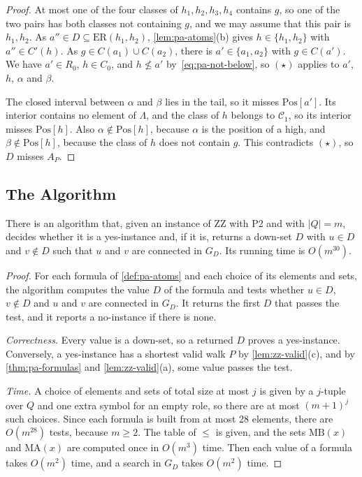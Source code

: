 \documentclass[pdflatex,sn-mathphys-num]{sn-jnl}%
\theoremstyle{thmstyleone}%
\theoremstyle{thmstyletwo}%
\theoremstyle{thmstylethree}%
\newcommand{\MB}{\mathrm{MB}}%
\newcommand{\MA}{\mathrm{MA}}%
\newcommand{\Pos}{\mathrm{Pos}}%
\newcommand{\ER}{\mathrm{ER}}%
\begin{document}
\begin{proof}
At most one of the four classes of $h_1, h_2, h_3, h_4$ contains $g$, so one of the two pairs has both classes not containing $g$, and we may assume that this pair is $h_1, h_2$.
As $a'' \in D \subseteq \ER(h_1, h_2)$, \cref{lem:pa-atoms}(b) gives $h \in \{h_1, h_2\}$ with $a'' \in C'(h)$.
As $g \in C(a_1) \cup C(a_2)$, there is $a' \in \{a_1, a_2\}$ with $g \in C(a')$.
We have $a' \in R_0$, $h \in C_0$, and $h \not\leq a'$ by~\eqref{eq:pa-not-below}, so $(\star)$ applies to $a'$, $h$, $\alpha$ and $\beta$.

The closed interval between $\alpha$ and $\beta$ lies in the tail, so it misses $\Pos[a']$.
Its interior contains no element of $\Lambda$, and the class of $h$ belongs to $\mathcal{C}_1$, so its interior misses $\Pos[h]$.
Also $\alpha \notin \Pos[h]$, because $\alpha$ is the position of a high, and $\beta \notin \Pos[h]$, because the class of $h$ does not contain $g$.
This contradicts $(\star)$, so $D$ misses $A_P$.
\end{proof}

\subsection{The Algorithm}
\label{sec:pa-algorithm}

\begin{corollary}
\label{cor:pa-zz}
There is an algorithm that, given an instance of ZZ with P2 and with $|Q| = m$, decides whether it is a yes-instance and, if it is, returns a down-set $D$ with $u \in D$ and $v \notin D$ such that $u$ and $v$ are connected in $G_D$.
Its running time is $O(m^{30})$.
\end{corollary}

\begin{proof}
For each formula of \cref{def:pa-atoms} and each choice of its elements and sets, the algorithm computes the value $D$ of the formula and tests whether $u \in D$, $v \notin D$ and $u$ and $v$ are connected in $G_D$.
It returns the first $D$ that passes the test, and it reports a no-instance if there is none.

\emph{Correctness.}
Every value is a down-set, so a returned $D$ proves a yes-instance.
Conversely, a yes-instance has a shortest valid walk $P$ by \cref{lem:zz-valid}(c), and by \cref{thm:pa-formulas} and \cref{lem:zz-valid}(a), some value passes the test.

\emph{Time.}
A choice of elements and sets of total size at most $j$ is given by a $j$-tuple over $Q$ and one extra symbol for an empty role, so there are at most $(m + 1)^j$ such choices.
Since each formula is built from at most 28 elements, there are $O(m^{28})$ tests, because $m \geq 2$.
The table of $\leq$ is given, and the sets $\MB(x)$ and $\MA(x)$ are computed once in $O(m^3)$ time.
Then each value of a formula takes $O(m^2)$ time, and a search in $G_D$ takes $O(m^2)$ time.
\end{proof}
\end{document}
